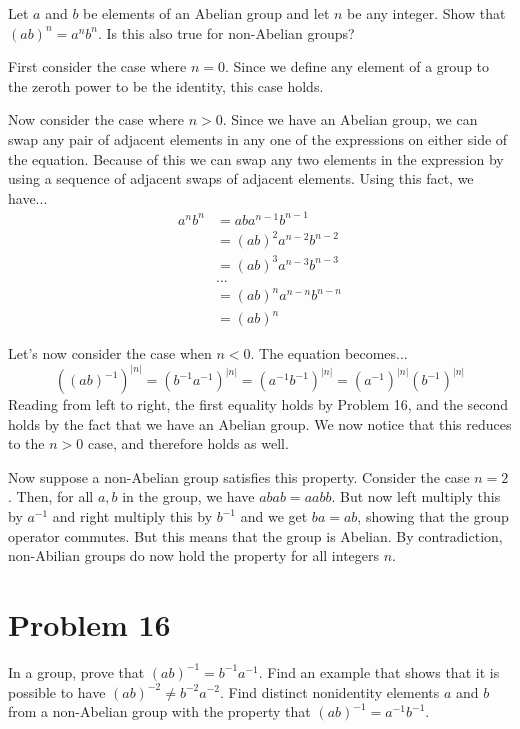 \documentclass{article}
\begin{document}
Let $a$ and $b$ be elements of an Abelian group and let $n$ be any integer.
Show that $(ab)^n=a^nb^n$.  Is this also true for non-Abelian groups?

First consider the case where $n=0$.  Since we define any element of a group
to the zeroth power to be the identity, this case holds.

Now consider the case where $n>0$.
Since we have an Abelian group, we can swap any pair of adjacent elements
in any one of the expressions on either side of the equation.  Because of this
we can swap any two elements in the expression by using a sequence of adjacent
swaps of adjacent elements.  Using this fact, we have...
\begin{align*}
a^nb^n &= aba^{n-1}b^{n-1} \\
 &= (ab)^2a^{n-2}b^{n-2} \\
 &= (ab)^3a^{n-3}b^{n-3} \\
 &\dots \\
 &= (ab)^na^{n-n}b^{n-n} \\
 &= (ab)^n
\end{align*}

Let's now consider the case when $n<0$.  The equation becomes...
\begin{equation*}
((ab)^{-1})^{|n|} = (b^{-1}a^{-1})^{|n|} = (a^{-1}b^{-1})^{|n|} = (a^{-1})^{|n|}(b^{-1})^{|n|}
\end{equation*}
Reading from left to right, the first equality holds by Problem 16, and the second holds
by the fact that we have an Abelian group.  We now notice that this reduces to the $n>0$ case,
and therefore holds as well.

Now suppose a non-Abelian group satisfies this property.  Consider the case $n=2$.
Then, for all $a,b$ in the group, we have $abab=aabb$.  But now
left multiply this by $a^{-1}$ and right multiply this by $b^{-1}$ and we get $ba=ab$,
showing that the group operator commutes.  But this means that the group is Abelian.
By contradiction, non-Abilian groups do now hold the property for all integers $n$.

\section*{Problem 16}

In a group, prove that $(ab)^{-1}=b^{-1}a^{-1}$.  Find an example that shows
that it is possible to have $(ab)^{-2}\neq b^{-2}a^{-2}$.  Find distinct nonidentity elements
$a$ and $b$ from a non-Abelian group with the property that $(ab)^{-1}=a^{-1}b^{-1}$.
\end{document}
